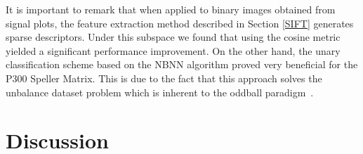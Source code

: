 \documentclass[utf8]{frontiersSCNS} %
\begin{document}

It is important to remark that when applied to binary images obtained from signal plots, the feature extraction method described in Section \ref{SIFT} generates sparse descriptors.  Under this subspace we found that using the cosine metric yielded a significant performance improvement. On the other hand, the unary classification scheme based on the NBNN algorithm proved very beneficial for the P300 Speller Matrix.  This is due to the fact that this approach solves the unbalance dataset problem which is inherent to the oddball paradigm~\citep{Tibon2015}.  


\section{Discussion}
\label{discussion}




\end{document}
